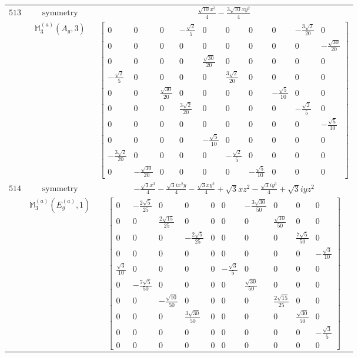 \documentclass[fleqn,8pt,landscape]{jsarticle}
\begin{document}
\begin{longtable}{ccc}
$ 513 $ & $ \text{symmetry} $ & $ \frac{\sqrt{10} x^{3}}{4} - \frac{3 \sqrt{10} x y^{2}}{4} $ \\
$  $ & $ \mathbb{M}_{3}^{(a)}(A_{g},3) $ & $ \begin{bmatrix} 0 & 0 & 0 & - \frac{\sqrt{2}}{5} & 0 & 0 & 0 & 0 & - \frac{3 \sqrt{2}}{20} & 0 \\ 0 & 0 & 0 & 0 & 0 & 0 & 0 & 0 & 0 & - \frac{\sqrt{30}}{20} \\ 0 & 0 & 0 & 0 & \frac{\sqrt{30}}{20} & 0 & 0 & 0 & 0 & 0 \\ - \frac{\sqrt{2}}{5} & 0 & 0 & 0 & 0 & \frac{3 \sqrt{2}}{20} & 0 & 0 & 0 & 0 \\ 0 & 0 & \frac{\sqrt{30}}{20} & 0 & 0 & 0 & 0 & - \frac{\sqrt{5}}{10} & 0 & 0 \\ 0 & 0 & 0 & \frac{3 \sqrt{2}}{20} & 0 & 0 & 0 & 0 & - \frac{\sqrt{2}}{5} & 0 \\ 0 & 0 & 0 & 0 & 0 & 0 & 0 & 0 & 0 & - \frac{\sqrt{5}}{10} \\ 0 & 0 & 0 & 0 & - \frac{\sqrt{5}}{10} & 0 & 0 & 0 & 0 & 0 \\ - \frac{3 \sqrt{2}}{20} & 0 & 0 & 0 & 0 & - \frac{\sqrt{2}}{5} & 0 & 0 & 0 & 0 \\ 0 & - \frac{\sqrt{30}}{20} & 0 & 0 & 0 & 0 & - \frac{\sqrt{5}}{10} & 0 & 0 & 0 \end{bmatrix} $ \\ \hline
$ 514 $ & $ \text{symmetry} $ & $ - \frac{\sqrt{3} x^{3}}{4} - \frac{\sqrt{3} i x^{2} y}{4} - \frac{\sqrt{3} x y^{2}}{4} + \sqrt{3} x z^{2} - \frac{\sqrt{3} i y^{3}}{4} + \sqrt{3} i y z^{2} $ \\
$  $ & $ \mathbb{M}_{3}^{(a)}(E_{g}^{(a)},1) $ & $ \begin{bmatrix} 0 & - \frac{2 \sqrt{5}}{25} & 0 & 0 & 0 & 0 & - \frac{3 \sqrt{30}}{50} & 0 & 0 & 0 \\ 0 & 0 & \frac{2 \sqrt{15}}{25} & 0 & 0 & 0 & 0 & \frac{\sqrt{10}}{50} & 0 & 0 \\ 0 & 0 & 0 & - \frac{2 \sqrt{5}}{25} & 0 & 0 & 0 & 0 & \frac{7 \sqrt{5}}{50} & 0 \\ 0 & 0 & 0 & 0 & 0 & 0 & 0 & 0 & 0 & - \frac{\sqrt{3}}{10} \\ \frac{\sqrt{3}}{10} & 0 & 0 & 0 & 0 & - \frac{\sqrt{3}}{5} & 0 & 0 & 0 & 0 \\ 0 & - \frac{7 \sqrt{5}}{50} & 0 & 0 & 0 & 0 & \frac{\sqrt{30}}{50} & 0 & 0 & 0 \\ 0 & 0 & - \frac{\sqrt{10}}{50} & 0 & 0 & 0 & 0 & \frac{2 \sqrt{15}}{25} & 0 & 0 \\ 0 & 0 & 0 & \frac{3 \sqrt{30}}{50} & 0 & 0 & 0 & 0 & \frac{\sqrt{30}}{50} & 0 \\ 0 & 0 & 0 & 0 & 0 & 0 & 0 & 0 & 0 & - \frac{\sqrt{3}}{5} \\ 0 & 0 & 0 & 0 & 0 & 0 & 0 & 0 & 0 & 0 \end{bmatrix} $ \\ \hline

\end{longtable}
\end{document}
